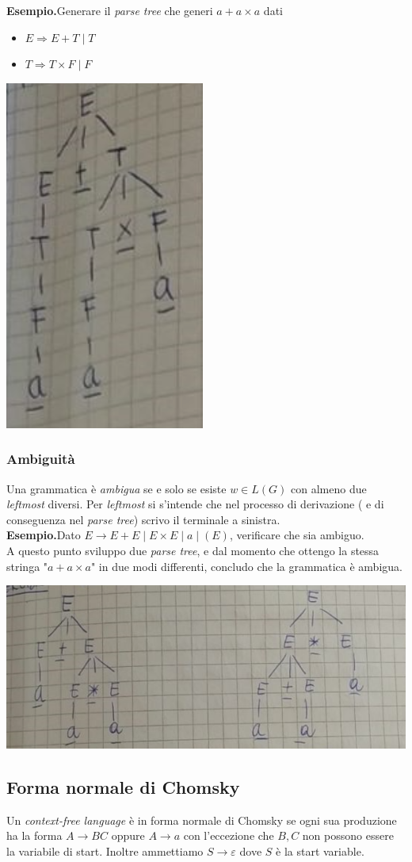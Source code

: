 \documentclass[italian]{article}
\newcommand{\taleche}{\;|\;}
\newcommand{\example}{\noindent\textbf{Esempio.\quad}}
\newcommand{\To}{\Rightarrow}
\begin{document}
\example Generare il \textit{parse tree} che generi $a+a\times a$ dati
\begin{itemize}
	\item $E \To E + T \taleche T$
	\item $T \To T \times F \taleche F$
\end{itemize}
\begin{center}
	\includegraphics[width=0.3\linewidth]{images/parse_tree_1}
\end{center}
\pagebreak
\subsubsection{Ambiguità}
Una grammatica è \textit{ambigua} se e solo se esiste $w \in L(G)$ con almeno due \textit{leftmost} diversi. Per \textit{leftmost} si s'intende che nel processo di derivazione ( e di conseguenza nel \textit{parse tree}) scrivo il terminale a sinistra.\\

\example Dato $E \to E+E \taleche E \times E \taleche a \taleche (E)$, verificare che sia ambiguo.\\

\noindent 
A questo punto sviluppo due \textit{parse tree}, e dal momento che ottengo la stessa stringa "$a+a\times a$" in due modi differenti, concludo che la grammatica è ambigua.
\begin{center}
	\includegraphics[width=0.5\linewidth]{images/parse_tree_2}
\end{center}
\subsection{Forma normale di Chomsky}
Un \textit{context-free language} è in forma normale di Chomsky se ogni sua produzione ha la forma $A \to BC$ oppure $A \to a$ con l'eccezione che $B,C$ non possono essere la variabile di start. Inoltre ammettiamo $S \to \varepsilon$ dove $S$ è la start variable.
\end{document}
